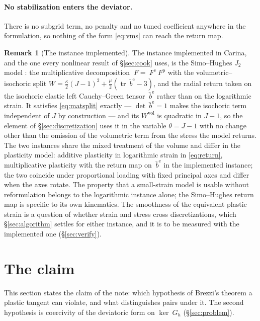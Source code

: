 \documentclass[11pt]{article}
\newcommand{\F}{~F}
\newcommand{\trace}{\operatorname{tr}}
\newcommand{\supvol}{^{\mathrm{vol}}}
\theoremstyle{definition}
\newtheorem{remark}{Remark}
\theoremstyle{plain}
\begin{document}
\paragraph{No stabilization enters the deviator.} There is no subgrid term, no
penalty and no tuned coefficient anywhere in the formulation, so nothing of the
form \eqref{eq:vms} can reach the return map.

\begin{remark}[The instance implemented]
\label{rem:whichj2}
The instance implemented in Carina, and the one every nonlinear result of
\S\ref{sec:cook} uses, is the Simo--Hughes $J_2$ model
\citep[BOX~9.1]{SimoHughes:1998}: the multiplicative decomposition
$\F = \F^{\mathrm e}\F^{\mathrm p}$ with the volumetric--isochoric split
$W = \tfrac{\kappa}{2}(J-1)^2 + \tfrac{\mu}{2}(\trace\bar{~b}^{\mathrm e} - 3)$,
and the radial return taken on the isochoric elastic left Cauchy--Green
tensor $\bar{~b}^{\mathrm e}$ rather than on the logarithmic strain. It
satisfies \eqref{eq:matsplit} exactly --- $\det\bar{~b}^{\mathrm e} = 1$
makes the isochoric term independent of $J$ by construction --- and its
$W\supvol$ is quadratic in $J-1$, so the element of
\S\ref{sec:discretization} uses it in the variable $\theta = J - 1$ with no
change other than the omission of the volumetric term from the stress the
model returns. The two instances share the mixed treatment of the volume
and differ in the plasticity model: additive plasticity in logarithmic
strain in \eqref{eq:return}, multiplicative plasticity with the return map
on $\bar{~b}^{\mathrm e}$ in the implemented instance; the two coincide
under proportional loading with fixed principal axes and differ when the
axes rotate. The property that a small-strain model is usable without
reformulation belongs to the logarithmic instance alone; the Simo--Hughes
return map is specific to its own kinematics. The smoothness of the
equivalent plastic strain is a question of whether strain and stress cross
discretizations, which \S\ref{sec:algorithm} settles for either instance,
and it is to be measured with the implemented one (\S\ref{sec:verify}).
\end{remark}

\section{The claim}
\label{sec:prediction}

This section states the claim of the note: which hypothesis of Brezzi's
theorem a plastic tangent can violate, and what distinguishes pairs under it.
The second hypothesis is coercivity of the deviatoric form on $\ker ~G_h$
(\S\ref{sec:problem}).
\end{document}
